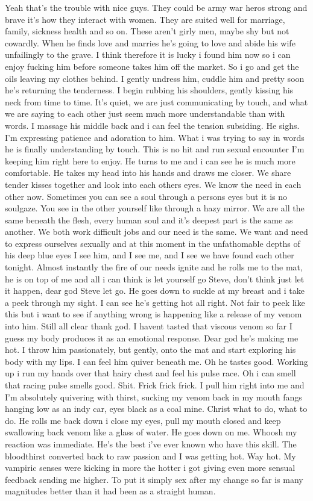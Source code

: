 Yeah that's the trouble with nice guys. They could be army war heros strong and brave it's how they interact with women. They are suited well for marriage, family, sickness health and so on. These aren't girly men, maybe shy but not cowardly. When he finds love and marries he's going to love and abide his wife unfailingly to the grave. I think therefore it is lucky i found him now so i can enjoy fucking him before someone takes him off the market. So i go and get the oils leaving my clothes behind. I gently undress him, cuddle him and pretty soon he's returning the tenderness. I begin rubbing his shoulders, gently kissing his neck from time to time. It's quiet, we are just communicating by touch, and what we are saying to each other just seem much more understandable than with words. I massage his middle back and i can feel the tension subsiding. He sighs. I'm expressing patience and adoration to him. What i was trying to say in words he is finally understanding by touch. This is no hit and run sexual encounter I'm keeping him right here to enjoy. He turns to me and i can see he is much more comfortable. He takes my head into his hands and draws me closer. We share tender kisses together and look into each others eyes. We know the need in each other now. Sometimes you can see a soul through a persons eyes but it is no soulgaze. You see in the other yourself like through a hazy mirror. We are all the same beneath the flesh, every human soul and it's deepest part is the same as another. We both work difficult jobs and our need is the same. We want and need to express ourselves sexually and at this moment in the unfathomable depths of his deep blue eyes I see him, and I see me, and I see we have found each other tonight. Almost instantly the fire of our needs ignite and he rolls me to the mat, he is on top of me and all i can think is let yourself go Steve, don't think just let it happen, dear god Steve let go. He goes down to suckle at my breast and i take a peek through my sight. I can see he's getting hot all right. Not fair to peek like this but i want to see if anything wrong is happening like a release of my venom into him. Still all clear thank god. I havent tasted that viscous venom so far I guess my body produces it as an emotional response. Dear god he's making me hot. I throw him passionately, but gently, onto the mat and start exploring his body with my lips. I can feel him quiver beneath me. Oh he tastes good. Working up i run my hands over that hairy chest and feel his pulse race. Oh i can smell that racing pulse smells good. Shit. Frick frick frick. I pull him right into me and I'm absolutely quivering with thirst, sucking my venom back in my mouth fangs hanging low as an indy car, eyes black as a coal mine. Christ what to do, what to do. He rolls me  back down i close my eyes, pull my mouth closed and keep swallowing back venom like a glass of water. He goes down on me. Whoosh my reaction was immediate. He's the best i've ever known who have this skill. The bloodthirst converted back to raw passion and I was getting hot. Way hot. My vampiric senses were kicking in more the hotter i got giving even more sensual feedback sending me higher. To put it simply sex after my change so far is many magnitudes better than it had been as a straight human. 

